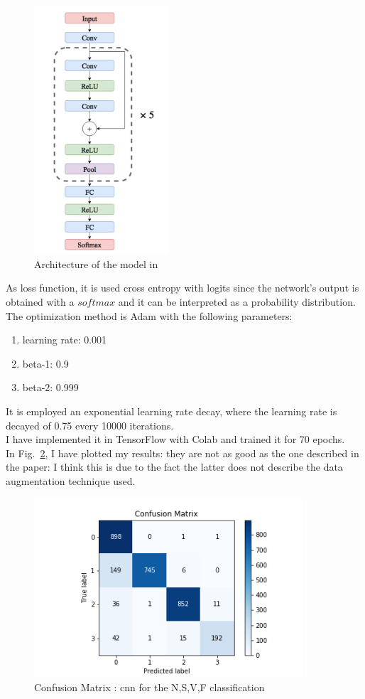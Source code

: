 \documentclass[LaM,binding=0.6cm]{sapthesis}
\begin{document}
\begin{figure}[H]  \centering
    \includegraphics[width=50mm,scale=0.7]{arch-cnn}
    \caption{Architecture of the model in \cite{cnnfazeli}}
    \label{fig:arch-cnn}
\end{figure}
As loss function, it is used cross entropy with logits since the network's output is obtained with a $softmax$ and it can be interpreted as a probability distribution.\\The optimization method is Adam with the following parameters:
\begin{enumerate}
\item learning rate: 0.001
\item beta-1: 0.9
\item beta-2: 0.999
\end{enumerate}
It is employed an exponential learning rate decay, where the learning rate is decayed of 0.75 every 10000 iterations.\\I have implemented it in TensorFlow with Colab and trained it for 70 epochs.\\In Fig.~\ref{fig:cnn1}, I have plotted my results: they are not as good as the one described in the paper: I think this is due to the fact the latter does not describe the data augmentation technique used.
\begin{figure}[H]  \centering
    \includegraphics[width=100mm,scale=0.7]{cnn-no-data-aug.png}
    \caption{Confusion Matrix : cnn for the N,S,V,F classification}
    \label{fig:cnn1}
\end{figure}
\end{document}
